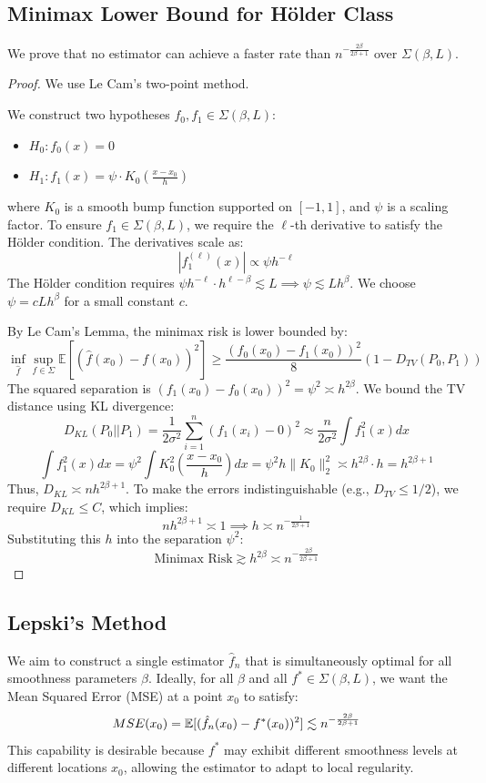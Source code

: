 \subsection{Minimax Lower Bound for H\"older Class}
We prove that no estimator can achieve a faster rate than $n^{-\frac{2\beta}{2\beta+1}}$ over $\Sigma(\beta, L)$. 
\begin{proof}
    We use Le Cam's two-point method.

We construct two hypotheses $f_0, f_1 \in \Sigma(\beta, L)$:
\begin{itemize}
    \item $H_0: f_0(x) = 0$
    \item $H_1: f_1(x) = \psi \cdot K_0\left( \frac{x - x_0}{h} \right)$
\end{itemize}
where $K_0$ is a smooth bump function supported on $[-1, 1]$, and $\psi$ is a scaling factor.
To ensure $f_1 \in \Sigma(\beta, L)$, we require the $\ell$-th derivative to satisfy the Hölder condition. The derivatives scale as:
$$ |f_1^{(\ell)}(x)| \propto \psi h^{-\ell} $$
The Hölder condition requires $\psi h^{-\ell} \cdot h^{\ell-\beta} \lesssim L \implies \psi \lesssim L h^\beta$.
We choose $\psi = c L h^\beta$ for a small constant $c$.

By Le Cam's Lemma, the minimax risk is lower bounded by:
$$ \inf_{\hat{f}} \sup_{f \in \Sigma} \mathbb{E} [(\hat{f}(x_0) - f(x_0))^2] \ge \frac{(f_0(x_0) - f_1(x_0))^2}{8} \left( 1 - D_{TV}(P_0, P_1) \right) $$
The squared separation is $(f_1(x_0) - f_0(x_0))^2 = \psi^2 \asymp h^{2\beta}$.
We bound the TV distance using KL divergence:
$$ D_{KL}(P_0 || P_1) = \frac{1}{2\sigma^2} \sum_{i=1}^n (f_1(x_i) - 0)^2 \approx \frac{n}{2\sigma^2} \int f_1^2(x) dx $$
$$ \int f_1^2(x) dx = \psi^2 \int K_0^2\left(\frac{x-x_0}{h}\right) dx = \psi^2 h \|K_0\|_2^2 \asymp h^{2\beta} \cdot h = h^{2\beta+1} $$
Thus, $D_{KL} \asymp n h^{2\beta+1}$. To make the errors indistinguishable (e.g., $D_{TV} \le 1/2$), we require $D_{KL} \le C$, which implies:
$$ n h^{2\beta+1} \asymp 1 \implies h \asymp n^{-\frac{1}{2\beta+1}} $$
Substituting this $h$ into the separation $\psi^2$:
$$ \text{Minimax Risk} \gtrsim h^{2\beta} \asymp n^{-\frac{2\beta}{2\beta+1}} $$
\end{proof}

\subsection{Lepski's Method}
We aim to construct a single estimator $\hat{f}_n$ that is simultaneously optimal for all smoothness parameters $\beta$. Ideally, for all $\beta$ and all $f^* \in \Sigma(\beta, L)$, we want the Mean Squared Error (MSE) at a point $x_0$ to satisfy:
\[
MSE(x_0) = \mathbb{E}[(\hat{f}_n(x_0) - f^*(x_0))^2] \lesssim n^{-\frac{2\beta}{2\beta+1}}
\]
This capability is desirable because $f^*$ may exhibit different smoothness levels at different locations $x_0$, allowing the estimator to adapt to local regularity.

